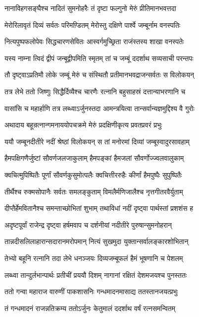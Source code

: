 \twolineshloka
{नानाविहगसङ्घैश्च नादितं सुमनोहरैः}
{तं दृष्टा फल्गुनो मेरुं प्रीतिमानभवत्तदा}


\twolineshloka
{मेरोरिलावृतं दिव्यं सर्वतः परिमण़्डितम्}
{मेरोस्तु दक्षिणे पार्श्वे जम्बूर्नाम वनस्पतिः}


\twolineshloka
{नित्यपुष्पफलोपेवः सिद्धचारणसेवितः}
{आस्वर्गमुच्छ्रिता राजंस्तस्य शाखा वनस्पतेः}


\twolineshloka
{यस्य नाम्ना त्विदं द्वीपं जन्बूद्वीपमिति स्मृतम्}
{तां च जम्बूं ददर्शाथ सव्यसाची परन्तपः}


\twolineshloka
{तौ दृष्ट्वाऽप्रतिमौ लोके जम्बूं मेरुं च संस्थितौ}
{प्रतीमानभवद्राजन्सर्वतः स विलोकयन्}


\twolineshloka
{तत्र लेभे ततो जिष्णुः सिद्धैर्दिव्यैश्च चारणैः}
{रत्नानि बहुसाहस्रं दत्तान्याभरणानि च}


\twolineshloka
{वासांसि च महार्हाणि तत्र लब्ध्वाऽर्जुनस्तदा}
{आमन्त्रयित्वा तान्सर्वान्यज्ञमुद्दिश्य वै गुरोः}


\twolineshloka
{अथादाय बहून्रत्नान्गमनाययोपचक्रमे}
{मेरुं प्रदक्षिणीकृत्य प्रवतप्रवरं प्रभुः}


\twolineshloka
{ययौ जम्बूनदीतीरे नदीं श्रेष्ठां विलोकयन्}
{स तां मनोरमां दिव्यां जम्बूस्वादुरसावहाम्}


\twolineshloka
{हैमपक्षिगणैर्जुष्टां सौवर्णजलजाकुलाम्}
{हैमपङ्कां हैमजलां सौवर्णोज्ज्वलवालुकाम्}


\twolineshloka
{क्वचित्मुपिष्पितैः पूर्णां सौवर्णकुसुमोत्पलैः}
{क्वचित्तीररुहैः कीर्णां हैमपुष्पैः सुपुष्पितैः}


\twolineshloka
{तीर्थैश्च रुक्मसोपानैः सर्वतः समलङ्कुताम्}
{विमलैर्मणिजालैश्च नृत्तगीतरवैर्युताम्}


\twolineshloka
{दीप्तैर्हेमवितानैश्च समन्ताच्छोभितां शुभाम्}
{तथाविधां नदीं दृष्ट्वा पार्थस्तां प्रशशंस ह}


\twolineshloka
{अदृष्टपूर्वां राजेन्द्र दृष्ट्वा हर्षमवाप च}
{दर्शनीयां नदीतीरे पुरुषान्सुमनोहरान्}


\twolineshloka
{तान्नदीसलिलाहारान्सदारानमरोपमान्}
{नित्यं सुखमुदा युक्तान्सर्वालङ्कारशोभितान्}


\twolineshloka
{तेभ्यो बहूनि रत्नानि तदा लेभे धनञ्जयः}
{दिव्यजम्बूफलं हैमं भूषणानि च पेशलम्}


\twolineshloka
{लब्ध्वा तान्दुर्लभान्पार्थः प्रतीचीं प्रययौ दिशम्}
{नागानां रक्षितं देशमजयश्च पुनस्ततः}


\twolineshloka
{ततो गन्वा महाराज वारुणीं पाकशासनिः}
{गन्धमादनमासाद्य ततस्तानजयत्प्रभुः}


\twolineshloka
{तं गन्धमादनं राजन्नतिक्रम्य ततोऽर्जुनः}
{केतुमालं ददर्शाथ वर्षं रत्नसमन्वितम्}


